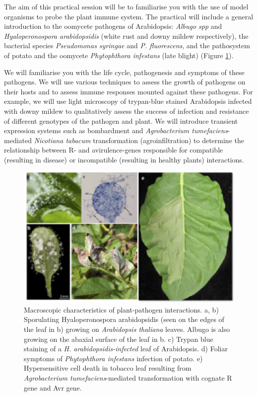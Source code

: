 \documentclass[12pt,]{book}
\begin{document}
The aim of this practical session will be to familiarise you with the
use of model organisms to probe the plant immune system. The practical
will include a general introduction to the oomycete pathogens of
Arabidopsis: \emph{Albugo spp} and \emph{Hyaloperonospora arabidopsidis}
(white rust and downy mildew respectively), the bacterial species
\emph{Pseudomonas syringae} and \emph{P. fluorescens}, and the
pathosystem of potato and the oomycete \emph{Phytophthora infestans}
(late blight) (Figure \ref{fig:leaves}).

We will familiarise you with the life cycle, pathogenesis and symptoms
of these pathogens. We will use various techniques to assess the growth
of pathogens on their hosts and to assess immune responses mounted
against these pathogens. For example, we will use light microscopy of
trypan-blue stained Arabidopsis infected with downy mildew to
qualitatively assess the success of infection and resistance of
different genotypes of the pathogen and plant. We will introduce
transient expression systems such as bombardment and \emph{Agrobacterium
tumefaciens}-mediated \emph{Nicotiana tabacum} transformation
(agroinfiltration) to determine the relationship between R- and
avirulence-genes responsible for compatible (resulting in disease) or
incompatible (resulting in healthy plants) interactions.











\begin{figure}
\includegraphics[width=6.48in]{assets/jones_fig2_prac} \caption{Macroscopic characteristics of plant-pathogen
interactions. a, b) Sporulating Hyaloperonospora arabidopsidis (seen on
the edges of the leaf in b) growing on \emph{Arabidopsis thaliana}
leaves. Albugo is also growing on the abaxial surface of the leaf in b.
c) Trypan blue staining of a \emph{H. arabidopsidis-infected} leaf of
Arabidopsis. d) Foliar symptoms of \emph{Phytophthora infestans}
infection of potato. e) Hypersensitive cell death in tobacco leaf
resulting from \emph{Agrobacterium tumefaciens}-mediated transformation
with cognate R gene and Avr gene.}\label{fig:leaves}
\end{figure}
\end{document}
